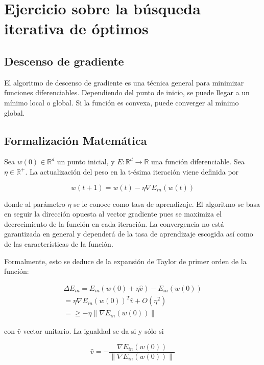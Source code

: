 \chapter{Ejercicio sobre la búsqueda iterativa de óptimos}

\section{Descenso de gradiente}

El algoritmo de descenso de gradiente es una técnica general para minimizar
funciones diferenciables. Dependiendo del punto de inicio, se puede llegar a un
mínimo local o global. Si la función es convexa, puede converger al mínimo
global. 

\medskip
\section{Formalización Matemática}
Sea $w(0) \in \mathbb{R}^d$ un punto inicial, y $E : \mathbb{R}^d \longrightarrow \mathbb R$
una función diferenciable. Sea $\eta \in \mathbb{R}^+$. La actualización del peso en 
la t-ésima iteración viene definida por 

\begin{equation*}
  w(t+1) = w(t) - \eta \nabla E_{in}(w(t))
\end{equation*}

donde al parámetro $\eta$ se le conoce como tasa de aprendizaje. El algoritmo se basa
en seguir la dirección opuesta al vector gradiente pues se maximiza el decrecimiento de
la función en cada iteración. La convergencia no está garantizada en general y dependerá
de la tasa de aprendizaje escogida así como de las características de la función. 

Formalmente, esto se deduce de la expansión de Taylor de primer orden de la función:
\cite{LFD}

\begin{equation}
\begin{aligned}
\Delta E_{in} = E_{in}(w(0) + \eta \hat{v}) - E_{in}(w(0)) \\
= \eta \nabla E_{in}(w(0))^T \hat{v} + O(\eta^2) \\
= \geq - \eta \lVert \nabla E_{in}(w(0)) \rVert
\end{aligned}
\end{equation}

con $\hat{v}$ vector unitario. La igualdad se da si y sólo si

\begin{equation*}
\hat{v} = - \frac{\nabla E_{in}(w(0))}{\lVert \nabla E_{in}(w(0)) \rVert}
\end{equation*}

